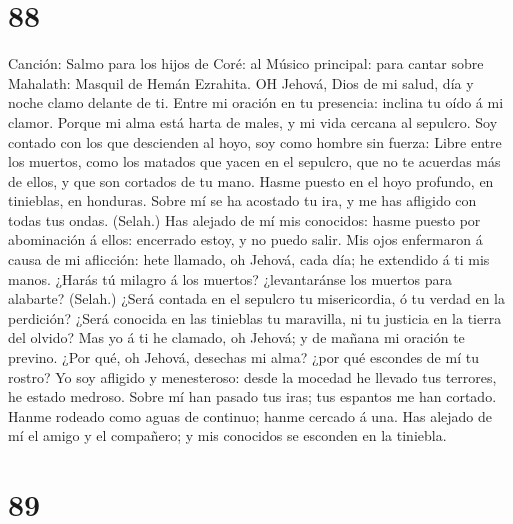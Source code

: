 \hypertarget{section-87}{%
\section{88}\label{section-87}}

 Canción: Salmo para los hijos de Coré: al Músico principal:
para cantar sobre Mahalath: Masquil de Hemán Ezrahita. OH Jehová, Dios
de mi salud, día y noche clamo delante de ti.  Entre mi
oración en tu presencia: inclina tu oído á mi clamor. 
Porque mi alma está harta de males, y mi vida cercana al sepulcro.
 Soy contado con los que descienden al hoyo, soy como hombre
sin fuerza:  Libre entre los muertos, como los matados que
yacen en el sepulcro, que no te acuerdas más de ellos, y que son
cortados de tu mano.  Hasme puesto en el hoyo profundo, en
tinieblas, en honduras.  Sobre mí se ha acostado tu ira, y
me has afligido con todas tus ondas. (Selah.)  Has alejado
de mí mis conocidos: hasme puesto por abominación á ellos: encerrado
estoy, y no puedo salir.  Mis ojos enfermaron á causa de mi
aflicción: hete llamado, oh Jehová, cada día; he extendido á ti mis
manos.  ¿Harás tú milagro á los muertos? ¿levantaránse los
muertos para alabarte? (Selah.)  ¿Será contada en el
sepulcro tu misericordia, ó tu verdad en la perdición? 
¿Será conocida en las tinieblas tu maravilla, ni tu justicia en la
tierra del olvido?  Mas yo á ti he clamado, oh Jehová; y de
mañana mi oración te previno.  ¿Por qué, oh Jehová,
desechas mi alma? ¿por qué escondes de mí tu rostro?  Yo
soy afligido y menesteroso: desde la mocedad he llevado tus terrores, he
estado medroso.  Sobre mí han pasado tus iras; tus espantos
me han cortado.  Hanme rodeado como aguas de continuo;
hanme cercado á una.  Has alejado de mí el amigo y el
compañero; y mis conocidos se esconden en la tiniebla.

\hypertarget{section-88}{%
\section{89}\label{section-88}}

